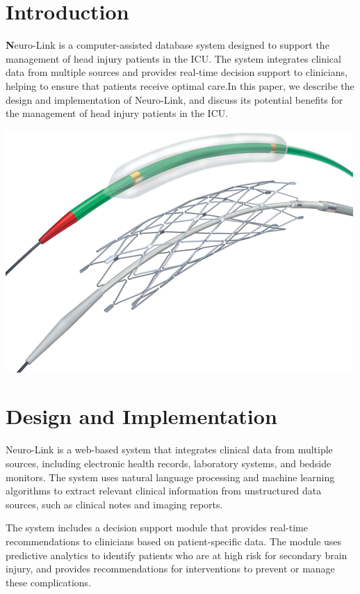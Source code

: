 \documentclass{article}
\begin{document}
\section{Introduction}

 \textbf{N}euro-Link is a computer-assisted database system designed to support the management of head injury patients in the ICU. The system integrates clinical data from multiple sources and provides real-time decision support to clinicians, helping to ensure that patients receive optimal care.In this paper, we describe the design and implementation of Neuro-Link, and discuss its potential benefits for the management of head injury patients in the ICU.

\begin{center}
  \includegraphics[width=\textwidth]{image1.png}
\end{center}


 

\section{Design and Implementation}

Neuro-Link is a web-based system that integrates clinical data from multiple sources, including electronic health records, laboratory systems, and bedside monitors. The system uses natural language processing and machine learning algorithms to extract relevant clinical information from unstructured data sources, such as clinical notes and imaging reports.

The system includes a decision support module that provides real-time recommendations to clinicians based on patient-specific data. The module uses predictive analytics to identify patients who are at high risk for secondary brain injury, and provides recommendations for interventions to prevent or manage these complications.
\end{document}
